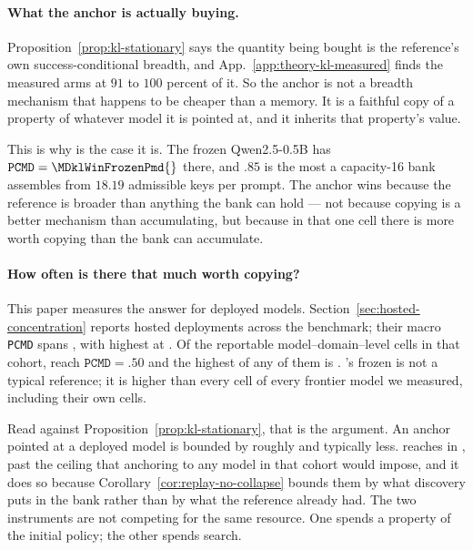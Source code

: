 \documentclass{article}
\newcommand{\1}{\mathbf 1}
\newcommand{\pmd}{\texttt{PCMD}}
\theoremstyle{remark}
\theoremstyle{definition}
\theoremstyle{plain}
\begin{document}
\paragraph{What the anchor is actually buying.}
Proposition~\ref{prop:kl-stationary} says the quantity being bought is the
reference's own success-conditional breadth, and
App.~\ref{app:theory-kl-measured} finds the measured arms at $91$ to $100$
percent of it. So the anchor is not a breadth mechanism that happens to be
cheaper than a memory. It is a faithful copy of a property of whatever model
it is pointed at, and it inherits that property's value.

This is why \MDklWinDomain{} is the case it is. The frozen Qwen2.5-0.5B has
$\pmd{}=\MDklWinFrozenPmd{}$ there, and $.85$ is the most a capacity-16 bank assembles from
$18.19$ admissible keys per prompt. The anchor wins because the reference is
broader than anything the bank can hold --- not because copying is a better
mechanism than accumulating, but because in that one cell there is more worth
copying than the bank can accumulate.

\paragraph{How often is there that much worth copying?}
This paper measures the answer for deployed models.
Section~\ref{sec:hosted-concentration} reports \MDklHostedModels{} hosted
deployments across the benchmark; their macro \pmd{} spans
\MDklHostedRange{}, with \MDklHostedHiModel{} highest at \MDklHostedHi{}. Of
the \MDklHostedCells{} reportable model--domain--level cells in that cohort,
\MDklHostedCellsHalf{} reach $\pmd{}=.50$ and the highest of any of them is
\MDklHostedCellMax{}. \MDklTopFrozenDomain{}'s frozen \MDklTopFrozenPmd{} is
not a typical reference; it is higher than every cell of every frontier model
we measured, including their own \MDklTopFrozenDomain{} cells.

Read against Proposition~\ref{prop:kl-stationary}, that is the argument. An
anchor pointed at a deployed model is bounded by roughly \MDklHostedHi{} and
typically less. \MDklTopMemoryArm{} reaches \MDklTopMemoryPmd{} in
\MDklTopMemoryDomain{}, past the ceiling that anchoring to any model in that
cohort would impose, and it does so because
Corollary~\ref{cor:replay-no-collapse} bounds them by what discovery puts in
the bank rather than by what the reference already had. The two instruments are
not competing for the same resource. One spends a property of the initial
policy; the other spends search.
\end{document}
